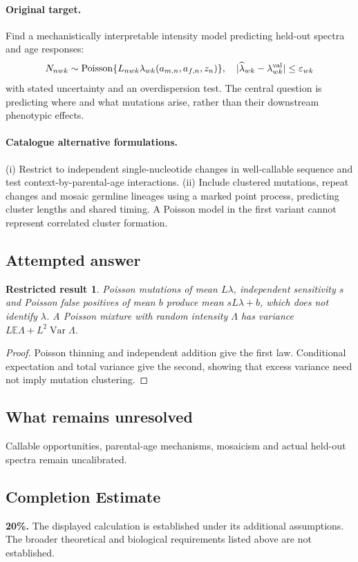 \documentclass[11pt]{article}
\newcommand{\E}{\mathbb E}
\DeclareMathOperator{\Var}{Var}
\providecommand{\E}{\mathbb E}
\providecommand{\Var}{\operatorname{Var}}
\newtheorem{attemptresult}{Restricted result}[section]
\begin{document}
\paragraph{Original target.}
Find a mechanistically interpretable intensity model predicting held-out spectra and age responses:
\[
N_{nwk}\sim\operatorname{Poisson}\{L_{nwk}\lambda_{wk}(a_{m,n},a_{f,n},z_n)\},
\quad |\widehat\lambda_{wk}-\lambda^{\rm val}_{wk}|\leq\varepsilon_{wk}
\]
with stated uncertainty and an overdispersion test. The central question is predicting where and what mutations arise, rather than their downstream phenotypic effects.
\paragraph{Catalogue alternative formulations.}
(i) Restrict to independent single-nucleotide changes in well-callable sequence and test context-by-parental-age interactions. (ii) Include clustered mutations, repeat changes and mosaic germline lineages using a marked point process, predicting cluster lengths and shared timing. A Poisson model in the first variant cannot represent correlated cluster formation.
\subsection{Attempted answer}
\begin{attemptresult}
Poisson mutations of mean $L\lambda$, independent sensitivity $s$ and Poisson false positives of mean $b$ produce mean $sL\lambda+b$, which does not identify $\lambda$. A Poisson mixture with random intensity $\Lambda$ has variance $L\E\Lambda+L^2\Var\Lambda$.
\end{attemptresult}
\begin{proof}
Poisson thinning and independent addition give the first law. Conditional expectation and total variance give the second, showing that excess variance need not imply mutation clustering.
\end{proof}
\subsection{What remains unresolved}
Callable opportunities, parental-age mechanisms, mosaicism and actual held-out spectra remain uncalibrated.
\subsection{Completion Estimate}
\textbf{20\%.} The displayed calculation is established under its additional assumptions. The broader theoretical and biological requirements listed above are not established.
\end{document}

